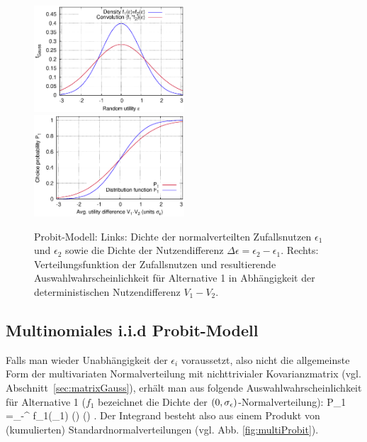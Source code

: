 \begin{figure}
 \includegraphics[width=0.5\textwidth]{./figsDiscr/fGauss.eps}   
 \includegraphics[width=0.5\textwidth]{./figsDiscr/binProbit_P1.eps}   

  \caption{\label{fig:distrProbit}Probit-Modell: Links: Dichte der 
normalverteilten Zufallsnutzen $\epsilon_1$ und $\epsilon_2$ sowie die
Dichte der Nutzendifferenz $\Delta \epsilon=\epsilon_2-\epsilon_1$. Rechts:
Verteilungsfunktion der Zufallsnutzen und resultierende
Auswahlwahrscheinlichkeit f\"ur Alternative 1 in Abh\"angigkeit der
deterministischen Nutzendifferenz $V_1-V_2$.
}
\end{figure}

\subsection{Multinomiales i.i.d Probit-Modell}
Falls man wieder Unabh\"angigkeit der $\epsilon_i$ voraussetzt, also
nicht die allgemeinste Form der multivariaten Normalverteilung
mit nichttrivialer Kovarianzmatrix
(vgl. Abschnitt~\ref{sec:matrixGauss}), erh\"alt man aus 
 folgende Auswahlwahrscheinlichkeit f\"ur
Alternative 1 ($f_1$ bezeichnet
 die Dichte der $(0,\sigma_{\epsilon})$-Normalverteilung):
\be
\label{multiProbit}
P_1 =\int\limits_{-\infty}^{\infty} f_1(\epsilon_1)
\Phi \left(\right)
\cdots
\Phi \left(\right)
.
\ee
Der Integrand besteht also aus einem Produkt von 
(kumulierten) Standardnormalverteilungen
(vgl. Abb. \ref{fig:multiProbit}).

